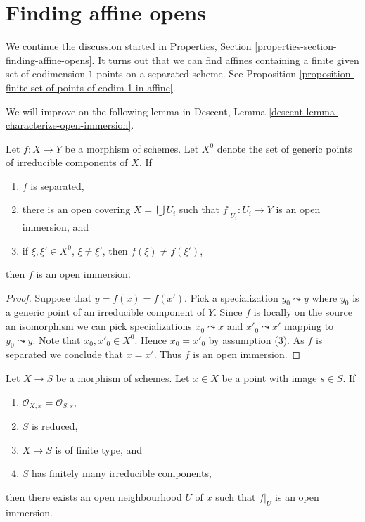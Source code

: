 \section{Finding affine opens}
\label{section-finding-affine-opens}

\noindent
We continue the discussion started in
Properties, Section \ref{properties-section-finding-affine-opens}.
It turns out that we can find affines containing a finite given set
of codimension $1$ points on a separated scheme. See
Proposition \ref{proposition-finite-set-of-points-of-codim-1-in-affine}.

\medskip\noindent
We will improve on the following lemma in
Descent, Lemma \ref{descent-lemma-characterize-open-immersion}.

\begin{lemma}
\label{lemma-characterize-open-immersion}
Let $f : X \to Y$ be a morphism of schemes. Let $X^0$ denote the set
of generic points of irreducible components of $X$. If
\begin{enumerate}
\item $f$ is separated,
\item there is an open covering $X = \bigcup U_i$ such that
$f|_{U_i} : U_i \to Y$ is an open immersion, and
\item if $\xi, \xi' \in X^0$, $\xi \not = \xi'$, then $f(\xi) \not = f(\xi')$,
\end{enumerate}
then $f$ is an open immersion.
\end{lemma}

\begin{proof}
Suppose that $y = f(x) = f(x')$. Pick a specialization $y_0 \leadsto y$
where $y_0$ is a generic point of an irreducible component of $Y$.
Since $f$ is locally on the source an isomorphism we can pick specializations
$x_0 \leadsto x$ and $x'_0 \leadsto x'$ mapping to $y_0 \leadsto y$.
Note that $x_0, x'_0 \in X^0$. Hence $x_0 = x'_0$ by assumption (3).
As $f$ is separated we conclude that $x = x'$. Thus $f$ is an open immersion.
\end{proof}

\begin{lemma}
\label{lemma-local-isomorphism}
Let $X \to S$ be a morphism of schemes. Let $x \in X$ be a point with
image $s \in S$. If
\begin{enumerate}
\item $\mathcal{O}_{X, x} = \mathcal{O}_{S, s}$,
\item $S$ is reduced,
\item $X \to S$ is of finite type, and
\item $S$ has finitely many irreducible components,
\end{enumerate}
then there exists an open neighbourhood $U$
of $x$ such that $f|_U$ is an open immersion.
\end{lemma}

